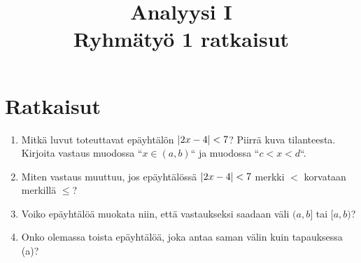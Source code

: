 \documentclass[11pt,a4paper]{amsart}
\title{Analyysi I\\Ryhmätyö 1 ratkaisut}
\author{}
\date{}
\begin{document}

\section{Ratkaisut}

\begin{exercise}
  \leavevmode\par
\begin{enumerate}[label=\alph*), nosep]
  \item Mitkä luvut toteuttavat epäyhtälön \(\lvert2x - 4\rvert < 7\)? Piirrä
    kuva tilanteesta. Kirjoita vastaus muodossa ``\(x \in (a, b)\)`` ja
    muodossa ``\(c < x < d\)``.
  \item Miten vastaus muuttuu, jos epäyhtälössä \(\lvert2x - 4\rvert < 7\) merkki
    \(<\) korvataan merkillä \(\leq\)?
  \item Voiko epäyhtälöä muokata niin, että vastaukseksi saadaan
    väli \((a, b]\) tai \([a, b)\)?
  \item Onko olemassa toista epäyhtälöä, joka antaa saman välin kuin
    tapauksessa (a)?
\end{enumerate}
\end{exercise}
\end{document}
